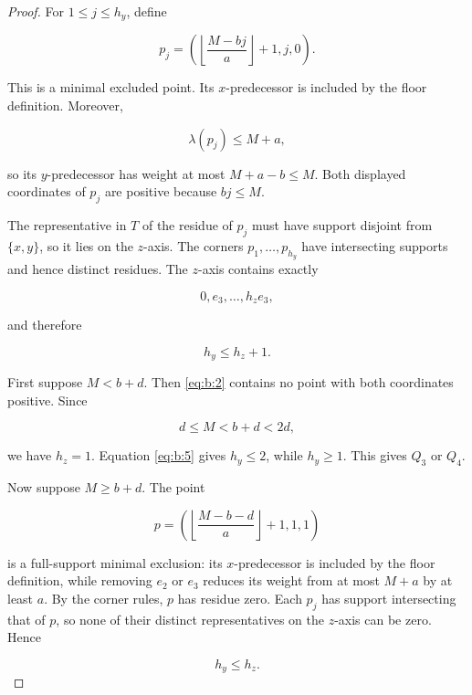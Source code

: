 \begin{proof}

For \(1\le j\le h_y\), define

\begin{equation}
p_j=
\left(
\left\lfloor\frac{M-bj}{a}\right\rfloor+1,
j,0
\right).
\label{eq:b:4}
\end{equation}

This is a minimal excluded point. Its \(x\)-predecessor is included by the
floor definition. Moreover,

\[
\lambda(p_j)\le M+a,
\]

so its \(y\)-predecessor has weight at most \(M+a-b\le M\). Both displayed
coordinates of \(p_j\) are positive because \(bj\le M\).

The representative in \(T\) of the residue of \(p_j\) must have support
disjoint from \(\{x,y\}\), so it lies on the \(z\)-axis. The corners
\(p_1,\ldots,p_{h_y}\) have intersecting supports and hence distinct
residues. The \(z\)-axis contains exactly

\[
0,e_3,\ldots,h_ze_3,
\]

and therefore

\begin{equation}
h_y\le h_z+1.
\label{eq:b:5}
\end{equation}

First suppose \(M<b+d\). Then \eqref{eq:b:2} contains no point with both coordinates
positive. Since

\[
d\le M<b+d<2d,
\]

we have \(h_z=1\). Equation \eqref{eq:b:5} gives \(h_y\le2\), while \(h_y\ge1\).
This gives \(Q_3\) or \(Q_4\).

Now suppose \(M\ge b+d\). The point

\begin{equation}
p=
\left(
\left\lfloor\frac{M-b-d}{a}\right\rfloor+1,
1,1
\right)
\label{eq:b:6}
\end{equation}

is a full-support minimal exclusion: its \(x\)-predecessor is included by
the floor definition, while removing \(e_2\) or \(e_3\) reduces its weight
from at most \(M+a\) by at least \(a\). By the corner rules, \(p\) has
residue zero. Each \(p_j\) has support intersecting that of \(p\), so none
of their distinct representatives on the \(z\)-axis can be zero. Hence

\begin{equation}
h_y\le h_z.
\label{eq:b:7}
\end{equation}


\end{proof}
